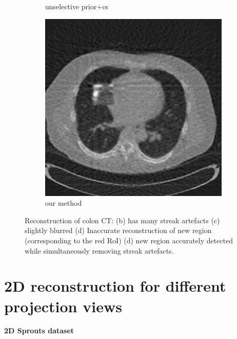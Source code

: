 \documentclass{article}
\begin{document}
\begin{figure}[h]
\begin{subfigure}[b]{0.3\linewidth}
        \caption{unselective prior+cs}
     \end{subfigure}
\quad
    \begin{subfigure}[b]{0.3\linewidth}
        \includegraphics[width=\textwidth]{../images/supplementary/colon/60_angles/weighted_pca5.png}
       \caption{our method}
     \end{subfigure}
      \caption{Reconstruction of colon CT: (b) has many streak artefacts (c) slightly blurred (d) Inaccurate reconstruction of new region (corresponding to the red RoI) (d) new region accurately detected while simultaneously removing streak artefacts.}
\label{fig:joint}
\end{figure}


\newpage
\section{2D reconstruction for different projection views}

\textbf{2D Sprouts dataset}
\end{document}
